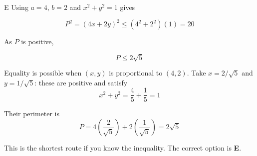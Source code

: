 \documentclass[11pt,a4paper]{article}
\begin{document}
\begin{enumerate}[label=\textbf{\arabic*.},leftmargin=*,itemsep=0pt,start=9]
\begin{djsSolution}{E}
Using $a=4$, $b=2$ and $x^2+y^2=1$ gives

\[
P^2=(4x+2y)^2\leq(4^2+2^2)(1)=20
\]

As $P$ is positive,

\[
P\leq2\sqrt5
\]

Equality is possible when $(x,y)$ is proportional to $(4,2)$. Take $x=2/\sqrt5$ and $y=1/\sqrt5$: these are positive and satisfy
\[
x^2+y^2=\frac45+\frac15=1
\]

Their perimeter is
\[
P=4\left(\frac{2}{\sqrt5}\right)+2\left(\frac{1}{\sqrt5}\right)=2\sqrt5
\]

This is the shortest route if you know the inequality. The correct option is \textbf{E}.
\end{djsSolution}
\end{enumerate}
\clearpage
\thispagestyle{djssolutions}
\vspace*{8pt}
\end{document}
